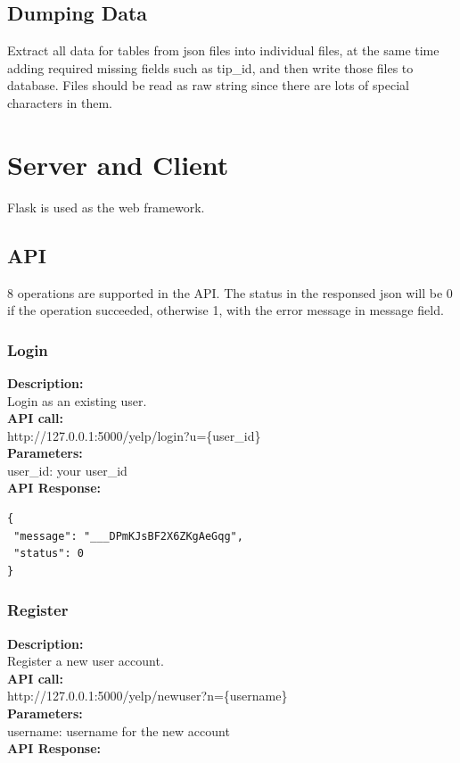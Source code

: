 \documentclass[12pt]{article}
\begin{document}
\subsection{Dumping Data}
Extract all data for tables from json files into individual files, at the same time adding required missing fields such as tip\_id, and then write those files to database. Files should be read as raw string since there are lots of special characters in them.
\section{Server and Client}\label{section-api}
Flask is used as the web framework.
\subsection{API}
8 operations are supported in the API. The status in the responsed json will be 0 if the operation succeeded, otherwise 1, with the error message in message field.

\subsubsection{Login}
\textbf{Description:}\\
Login as an existing user.\\
\textbf{API call:}\\ 
http://127.0.0.1:5000/yelp/login?u=\{user\_id\}\\
\textbf{Parameters:}\\
user\_id: your user\_id\\
\textbf{API Response:}

\begin{singlespacing}
\begin{lstlisting}
{
 "message": "___DPmKJsBF2X6ZKgAeGqg",
 "status": 0
}
\end{lstlisting}
\end{singlespacing}

\subsubsection{Register}
\textbf{Description:}\\
Register a new user account.\\
\textbf{API call:}\\
http://127.0.0.1:5000/yelp/newuser?n=\{username\}\\
\textbf{Parameters:}\\
username: username for the new account\\
\textbf{API Response:}
\end{document}
